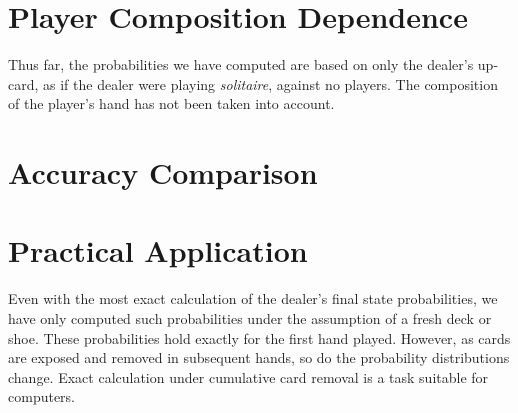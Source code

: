 \section{Player Composition Dependence}
\label{sec:dealer:composition}

Thus far, the probabilities we have computed are based on
only the dealer's up-card, as if the dealer were playing \emph{solitaire},
against no players.  
The composition of the player's hand has not been taken into account.

\section{Accuracy Comparison}
\label{sec:dealer:accuracy}

\section{Practical Application}
\label{sec:dealer:practical}

Even with the most exact calculation of the dealer's final state 
probabilities, we have only computed such probabilities 
under the assumption of a fresh deck or shoe.
These probabilities hold exactly for the first hand played.  
However, as cards are exposed and removed in subsequent hands, 
so do the probability distributions change.  
Exact calculation under cumulative card removal is a task
suitable for computers.  

